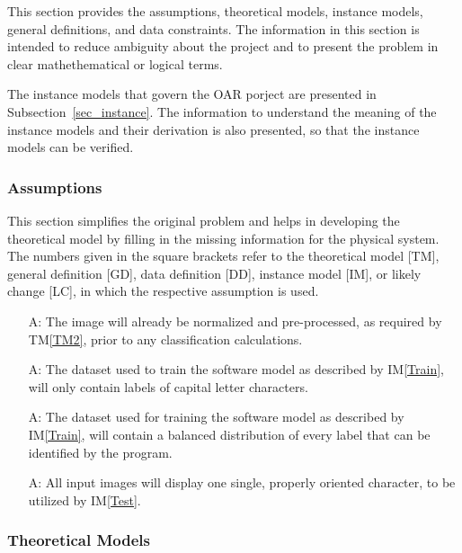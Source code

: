 \documentclass[12pt]{article}
\newcommand{\tref}[1]{TM\ref{#1}}
\newcounter{assumpnum} %
\newcommand{\iref}[1]{IM\ref{#1}}
\begin{document}
This section provides the assumptions, theoretical models, instance models, general definitions,
and data constraints. The information in this section is intended to reduce ambiguity about the project and 
to present the problem in clear mathethematical or logical terms.

The instance models that govern the OAR porject are presented in
Subsection~\ref{sec_instance}.  The information to understand the meaning of the
instance models and their derivation is also presented, so that the instance
models can be verified.

\subsubsection{Assumptions} \label{sec_assumpt}


This section simplifies the original problem and helps in developing the
theoretical model by filling in the missing information for the physical system.
The numbers given in the square brackets refer to the theoretical model [TM],
general definition [GD], data definition [DD], instance model [IM], or likely
change [LC], in which the respective assumption is used.

\begin{itemize}

\item[A\refstepcounter{assumpnum}\theassumpnum \label{A1}:] The image will already be normalized and pre-processed, 
as required by \tref{TM2}, prior to any classification calculations.
\item[A\refstepcounter{assumpnum}\theassumpnum \label{A2}:] The dataset used to train the software model
as described by \iref{Train}, will only contain labels of capital letter characters.
\item[A\refstepcounter{assumpnum}\theassumpnum \label{A3}:] The dataset used for training the software model
as described by \iref{Train}, will contain a balanced distribution of every label that can be identified by the program.
\item[A\refstepcounter{assumpnum}\theassumpnum \label{A4}:] All input images will display one single, properly oriented character,
to be utilized by \iref{Test}.

\end{itemize}

\subsubsection{Theoretical Models}\label{sec_theoretical}
\end{document}
